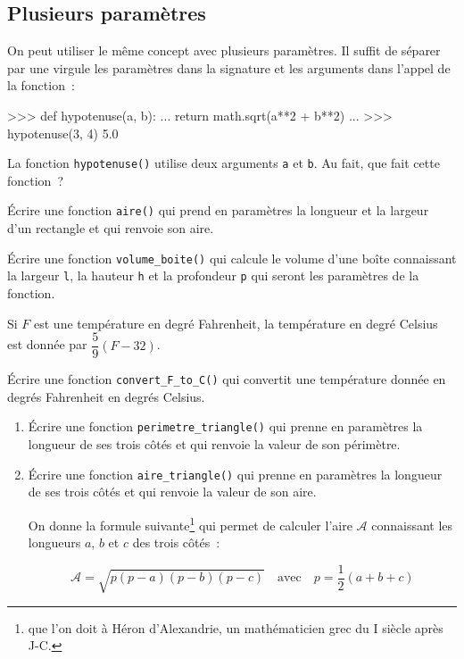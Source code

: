 \subsection{Plusieurs paramètres}
On peut utiliser le même concept avec plusieurs paramètres. Il suffit de séparer par une
virgule \motcle{,} les paramètres  dans la signature et les arguments dans l'appel de la fonction~:

\begin{pythoncode}
>>> def hypotenuse(a, b):
...     return math.sqrt(a**2 + b**2)
...
>>> hypotenuse(3, 4)
5.0
\end{pythoncode}

La fonction \texttt{hypotenuse()} utilise deux arguments \texttt{a} et \texttt{b}.
Au fait, que fait cette fonction~?

\begin{exercice}
Écrire une fonction \texttt{aire()} qui prend en paramètres la longueur et la largeur
d'un rectangle et qui renvoie son aire.
\end{exercice}

\begin{exercice}
Écrire une fonction \texttt{volume\_boite()} qui calcule le volume d'une boîte connaissant
la  largeur \texttt{l}, la hauteur \texttt{h} et la profondeur \texttt{p}
qui seront les paramètres de la fonction.
\end{exercice}

\begin{exercice}
Si $F$ est une température en degré Fahrenheit, la température en degré Celsius est donnée par
$\dfrac59(F - 32)$.

Écrire une fonction \texttt{convert\_F\_to\_C()} qui convertit une température donnée en degrés
Fahrenheit en degrés Celsius.
\end{exercice}

\begin{exercice} [Triangle]
\begin{enumerate}
	\item Écrire une fonction \texttt{perimetre\_triangle()} qui prenne en paramètres la longueur de
	ses trois côtés et qui renvoie la valeur de son périmètre.
	\item Écrire une fonction \texttt{aire\_triangle()} qui prenne en paramètres la longueur de
	ses trois côtés et qui renvoie la valeur de son aire.

	On donne la formule suivante\footnote{que l'on doit à Héron d'Alexandrie, un mathématicien grec
	du I\ier{} siècle après J-C.}
	qui permet de calculer l'aire $\mathcal{A}$ connaissant les longueurs $a$, $b$ et $c$ des trois
	côtés~:

	\[\mathcal{A} = \sqrt{p(p-a)(p-b)(p-c)}\quad\text{avec}\quad p = \frac 12 (a+b+c)\]
\end{enumerate}
\end{exercice}